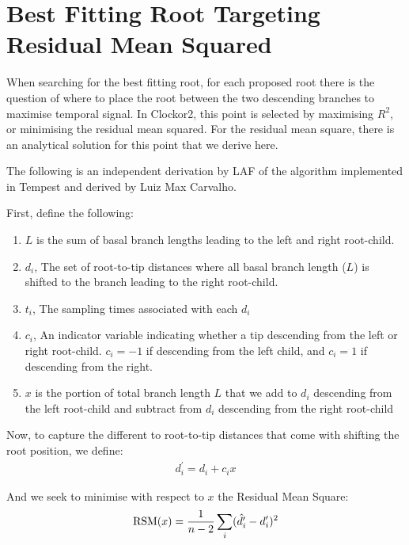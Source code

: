 \documentclass{article}
\begin{document}
\section{Best Fitting Root Targeting Residual Mean Squared}
When searching for the best fitting root, for each proposed root there is the question of where to place the root between the two descending branches to maximise temporal signal. In Clockor2, this point is selected by maximising $R^2$, or minimising the residual mean squared. For the residual mean square, there is an analytical solution for this point that we derive here.

The following is an independent derivation by LAF of the algorithm implemented in Tempest and derived by Luiz Max Carvalho.

First, define the following:
\begin{enumerate}

    \item $L$ is the sum of basal branch lengths leading to the left and right root-child.
    \item {$d_i$}, The set of root-to-tip distances where all basal branch length ($L$) is shifted to the branch leading to the right root-child.
    \item {$t_i$}, The sampling times associated with each $d_i$
    \item {$c_i$}, An indicator variable indicating whether a tip descending from the left or right root-child. $c_i = -1$ if descending from the left child, and $c_i = 1$ if descending from the right.
    \item $x$ is the portion of total branch length $L$ that we add to $d_i$ descending from the left root-child and subtract from $d_i$ descending from the right root-child
\end{enumerate}

Now, to capture the different to root-to-tip distances that come with shifting the root position, we define:
\begin{equation}
\begin{aligned}
    d^{\prime}_i = d_{i} + c_{i}x
\end{aligned}
\end{equation}

And we seek to minimise with respect to $x$ the Residual Mean Square:
\begin{equation}
    \textnormal{RSM}(x) = \frac{1}{n-2}\sum_{i}(\hat{d^{\prime}_i} - d^{\prime}_i)^2
\end{equation}
\end{document}
